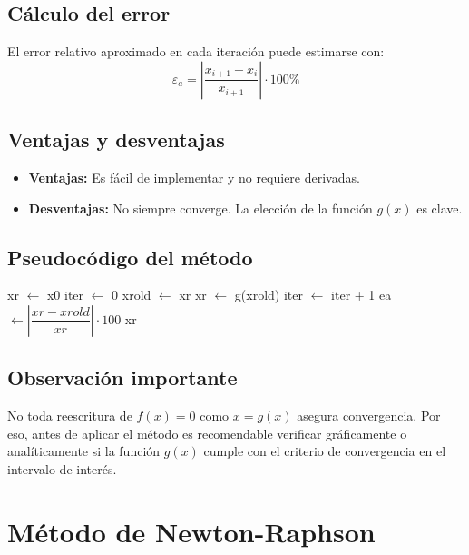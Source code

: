 \documentclass[12pt,letterpaper]{article}
\theoremstyle{definition}
\theoremstyle{plain}
\theoremstyle{remark}
\begin{document}
\subsection*{Cálculo del error}

El error relativo aproximado en cada iteración puede estimarse con:
\[
\varepsilon_a = \left| \frac{x_{i+1} - x_i}{x_{i+1}} \right| \cdot 100\%
\]

\subsection*{Ventajas y desventajas}

\begin{itemize}
    \item {\bf Ventajas:} Es fácil de implementar y no requiere derivadas.
    \item {\bf Desventajas:} No siempre converge. La elección de la función $g(x)$ es clave.
\end{itemize}

\subsection*{Pseudocódigo del método}

\begin{algorithmic}[1]
    \State xr $\gets$ x0
    \State iter $\gets$ 0
    \Repeat
        \State xrold $\gets$ xr
        \State xr $\gets$ g(xrold)
        \State iter $\gets$ iter + 1
            \State ea $\gets \left| \dfrac{xr - xrold}{xr} \right| \cdot 100$
        \EndIf
    \State \Return xr
\EndFunction
\end{algorithmic}

\subsection*{Observación importante}

No toda reescritura de $f(x) = 0$ como $x = g(x)$ asegura convergencia. Por eso, antes de aplicar el método es recomendable verificar gráficamente o analíticamente si la función $g(x)$ cumple con el criterio de convergencia en el intervalo de interés.

\section{Método de Newton-Raphson}
\end{document}
